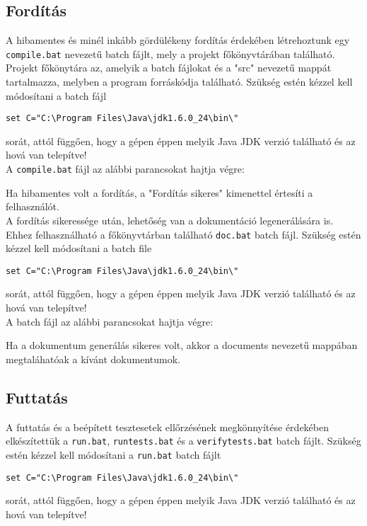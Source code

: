 \subsection{Fordítás}
A hibamentes és minél inkább gördülékeny fordítás érdekében létrehoztunk egy \texttt{compile.bat} nevezetű batch fájlt, mely a projekt főkönyvtárában található. Projekt főkönytára az, amelyik a batch fájlokat és a "src" nevezetű mappát tartalmazza, melyben a program forráskódja található. Szükség estén kézzel kell módosítani a batch fájl
\begin{verbatim}
set C="C:\Program Files\Java\jdk1.6.0_24\bin\" 
\end{verbatim}
sorát, attól függően, hogy a gépen éppen melyik Java JDK verzió található és az hová van telepítve!\\

A \texttt{compile.bat} fájl az alábbi parancsokat hajtja végre:

Ha hibamentes volt a fordítás, a "Fordítás sikeres" kimenettel értesíti a felhasználót.\\

A fordítás sikeressége után, lehetőség van a dokumentáció legenerálására is. Ehhez felhasználható a főkönyvtárban található \texttt{doc.bat} batch fájl.
Szükség estén kézzel kell módosítani a batch file \begin{verbatim}
set C="C:\Program Files\Java\jdk1.6.0_24\bin\" 
\end{verbatim}
sorát, attól függően, hogy a gépen éppen melyik Java JDK verzió található és az hová van telepítve!\\

A batch fájl az alábbi parancsokat hajtja végre:

Ha a dokumentum generálás sikeres volt, akkor a documents nevezetű mappában megtaláhatóak a kívánt dokumentumok.



\subsection{Futtatás}
A futtatás és a beépített tesztesetek ellőrzésének megkönnyítése érdekében elkészítettük a \texttt{run.bat}, \texttt{runtests.bat} és a \texttt{verifytests.bat} batch fájlt.
Szükség estén kézzel kell módosítani a \texttt{run.bat} batch fájlt 
\begin{verbatim}
set C="C:\Program Files\Java\jdk1.6.0_24\bin\" 
\end{verbatim} sorát, attól függően, hogy a gépen éppen melyik Java JDK verzió található és az hová van telepítve!\\

